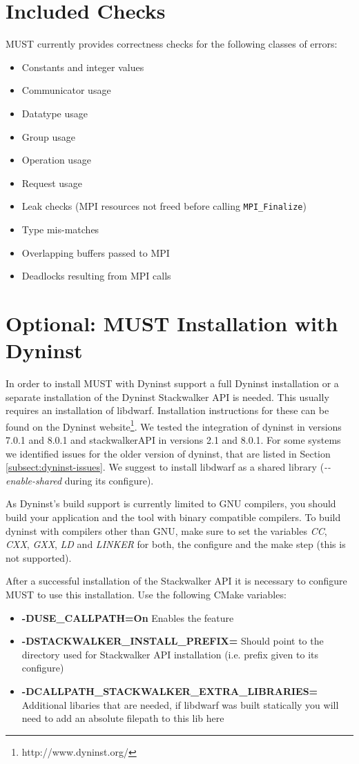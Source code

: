 \documentclass[english]{scrartcl}
\begin{document}
\section{Included Checks}
MUST currently provides correctness checks for the following classes of errors:
\begin{itemize}
  \item Constants and integer values
  \item Communicator usage
  \item Datatype usage
  \item Group usage
  \item Operation usage
  \item Request usage
  \item Leak checks (MPI resources not freed before
  calling \texttt{MPI\_Finalize})
  \item Type mis-matches
  \item Overlapping buffers passed to MPI
  \item Deadlocks resulting from MPI calls
\end{itemize}

\section{Optional: MUST Installation with Dyninst}
\label{section:dyninst}
In order to install MUST with Dyninst support a full Dyninst installation or a
separate installation of the Dyninst Stackwalker API is needed. This usually
requires an installation of libdwarf. Installation instructions for these can be
found on the Dyninst website\footnote{http://www.dyninst.org/}. We tested the integration of 
dyninst in versions 7.0.1 and 8.0.1 and stackwalkerAPI in versions 2.1 and 8.0.1.
For some systems we identified issues for the older version of dyninst, 
that are listed in Section \ref{subsect:dyninst-issues}. 
We suggest to
install libdwarf as a shared library (\emph{\mbox{-{}-}enable-shared} during its
configure).

As Dyninst's build support is currently limited to GNU compilers, you should 
build your application and the tool with binary compatible compilers. 
To build dyninst 
with compilers other than GNU, make sure to set the variables \emph{CC}, \emph{CXX}, 
\emph{GXX}, \emph{LD} and \emph{LINKER} for both, the configure and the make step 
(this is not supported).

After a successful installation of the Stackwalker API it is necessary
to configure MUST to use this installation. Use the following CMake variables:
\begin{itemize}
  \item \textbf{-DUSE\_CALLPATH=On} Enables the feature
  \item \textbf{-DSTACKWALKER\_INSTALL\_PREFIX=} Should point to the 
  directory used for Stackwalker API installation (i.e. prefix given to its
  configure)
  \item \textbf{-DCALLPATH\_STACKWALKER\_EXTRA\_LIBRARIES=} Additional libaries
  that are needed, if libdwarf was built statically you will need to add an
  absolute filepath to this lib here
\end{itemize}
\end{document}
